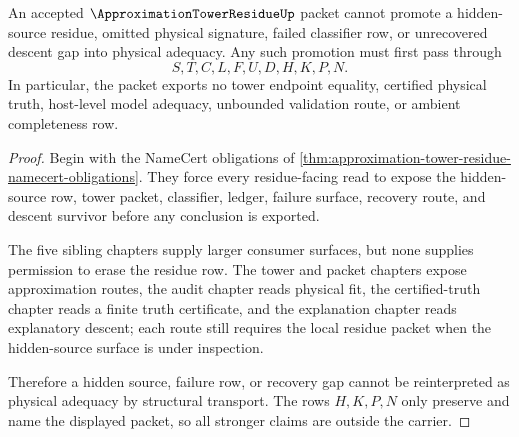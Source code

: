 \begin{theorem}
\label{thm:approximation-tower-residue-nonescape}
An accepted $\ApproximationTowerResidueUp$ packet cannot promote a hidden-source residue, omitted physical signature, failed classifier row, or unrecovered descent gap into physical adequacy. Any such promotion must first pass through
$$
S,T,C,L,F,U,D,H,K,P,N.
$$
In particular, the packet exports no tower endpoint equality, certified physical truth, host-level model adequacy, unbounded validation route, or ambient completeness row.
\end{theorem}
\begin{proof}
Begin with the NameCert obligations of \autoref{thm:approximation-tower-residue-namecert-obligations}. They force every residue-facing read to expose the hidden-source row, tower packet, classifier, ledger, failure surface, recovery route, and descent survivor before any conclusion is exported.

The five sibling chapters supply larger consumer surfaces, but none supplies permission to erase the residue row. The tower and packet chapters expose approximation routes, the audit chapter reads physical fit, the certified-truth chapter reads a finite truth certificate, and the explanation chapter reads explanatory descent; each route still requires the local residue packet when the hidden-source surface is under inspection.

Therefore a hidden source, failure row, or recovery gap cannot be reinterpreted as physical adequacy by structural transport. The rows $H,K,P,N$ only preserve and name the displayed packet, so all stronger claims are outside the carrier.
\end{proof}

